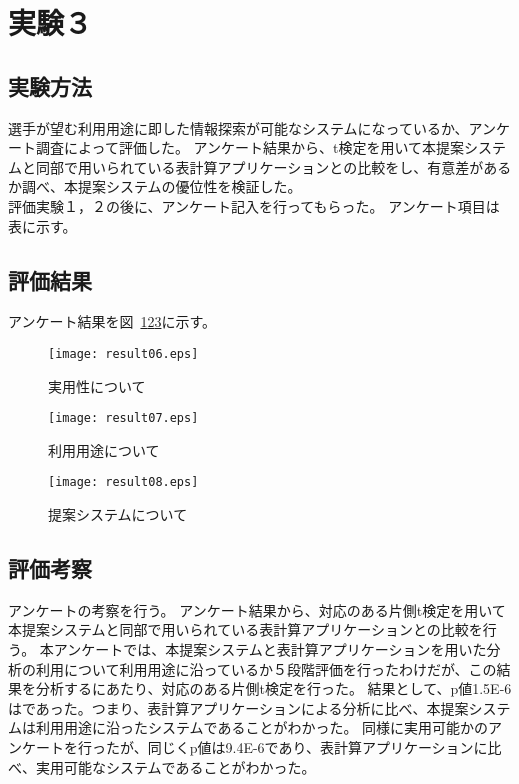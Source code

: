 \documentclass[sotsuron]{kuee}
\begin{document}
	\section{実験３}
		\subsection{実験方法}
			選手が望む利用用途に即した情報探索が可能なシステムになっているか、アンケート調査によって評価した。
			アンケート結果から、t検定を用いて本提案システムと同部で用いられている表計算アプリケーションとの比較をし、有意差があるか調べ、本提案システムの優位性を検証した。
			\\評価実験１，２の後に、アンケート記入を行ってもらった。
			アンケート項目は表に示す。
		\subsection{評価結果}
		アンケート結果を図~\ref{fig:result06}\ref{fig:result07}\ref{fig:result08}に示す。
			\begin{figure}
				\begin{center}
					\texttt{[image: result06.eps]}
				\end{center}
				\caption{実用性について}
		  		\label{fig:result06}
			\end{figure}
			\begin{figure}
				\begin{center}
					\texttt{[image: result07.eps]}
				\end{center}
				\caption{利用用途について}
		  		\label{fig:result07}
			\end{figure}
			\begin{figure}
				\begin{center}
					\texttt{[image: result08.eps]}
				\end{center}
				\caption{提案システムについて}
		  		\label{fig:result08}
			\end{figure}
		\subsection{評価考察}
			アンケートの考察を行う。
			アンケート結果から、対応のある片側t検定を用いて本提案システムと同部で用いられている表計算アプリケーションとの比較を行う。
			本アンケートでは、本提案システムと表計算アプリケーションを用いた分析の利用について利用用途に沿っているか５段階評価を行ったわけだが、この結果を分析するにあたり、対応のある片側t検定を行った。
			結果として、p値1.5E-6はであった。つまり、表計算アプリケーションによる分析に比べ、本提案システムは利用用途に沿ったシステムであることがわかった。
			同様に実用可能かのアンケートを行ったが、同じくp値は9.4E-6であり、表計算アプリケーションに比べ、実用可能なシステムであることがわかった。
\end{document}
